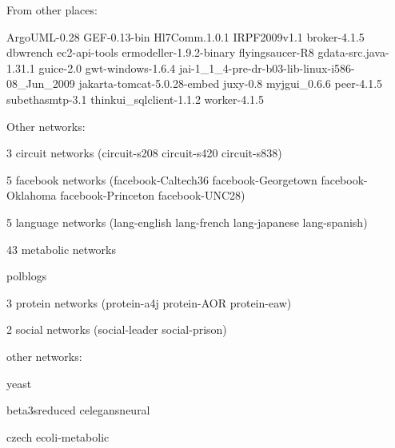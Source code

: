 From other places:

ArgoUML-0.28
GEF-0.13-bin
Hl7Comm.1.0.1
IRPF2009v1.1
broker-4.1.5
dbwrench
ec2-api-tools
ermodeller-1.9.2-binary
flyingsaucer-R8
gdata-src.java-1.31.1
guice-2.0
gwt-windows-1.6.4
jai-1\_1\_4-pre-dr-b03-lib-linux-i586-08\_Jun\_2009
jakarta-tomcat-5.0.28-embed
juxy-0.8
myjgui\_0.6.6
peer-4.1.5
subethasmtp-3.1
thinkui\_sqlclient-1.1.2
worker-4.1.5

Other networks:

3 circuit networks (circuit-s208 circuit-s420 circuit-s838)

5 facebook networks (facebook-Caltech36 facebook-Georgetown facebook-Oklahoma
facebook-Princeton facebook-UNC28)

5 language networks (lang-english  lang-french lang-japanese lang-spanish)

43 metabolic networks

polblogs

3 protein networks (protein-a4j protein-AOR protein-eaw)

2 social networks (social-leader social-prison)

other networks:

yeast

beta3sreduced
celegansneural

czech
ecoli-metabolic
